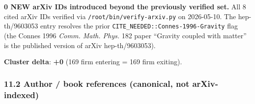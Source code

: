 \documentclass[
  11pt,
  a4paper,
]{amsart}
\begin{document}
\textbf{0 NEW arXiv IDs introduced beyond the previously verified set.} All 8
cited arXiv IDs verified via \texttt{/root/bin/verify-arxiv.py} on 2026-05-10. The
hep-th/9603053 entry resolves the prior \texttt{CITE\_NEEDED::Connes-1996-Gravity} flag
(the Connes 1996 \emph{Comm. Math. Phys.} 182 paper ``Gravity coupled with matter''
is the published version of arXiv hep-th/9603053).

\textbf{Cluster delta}: \textbf{+0} (169 firm entering = 169 firm exiting).

\hypertarget{author-book-references-canonical-not-arxiv-indexed}{%
\subsubsection{11.2 Author / book references (canonical, not arXiv-indexed)}\label{author-book-references-canonical-not-arxiv-indexed}}
\end{document}
